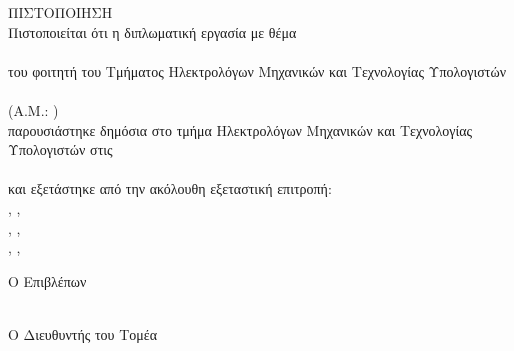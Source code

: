 \pagestyle{empty}
\begin{center}
{\LARGE ΠΙΣΤΟΠΟΙΗΣΗ\\[1cm]}
\large Πιστοποιείται ότι η διπλωματική εργασία με θέμα\\[1cm]
\textbf{\bf \large \doctitle }\\[1cm]
του φοιτητή του Τμήματος Ηλεκτρολόγων Μηχανικών και Τεχνολογίας Υπολογιστών\\[1cm]
\textbf{\metonoi}\\[0.5cm]
(Α.Μ.: \studnum)\\[1cm]
παρουσιάστηκε δημόσια στο τμήμα  Ηλεκτρολόγων Μηχανικών και Τεχνολογίας Υπολογιστών στις\\[1cm]
\Large{\imerominiaExetasis}\\[1cm]
\large και εξετάστηκε από την ακόλουθη εξεταστική επιτροπή:\\[1cm]
\supname, \suptitle, \uoP\\[0.2cm]
\epitropiEna, \epitropiEnaTitle, \uoP\\[0.2cm]
\epitropiDyo, \epitropiDyoTitle, \uoP\\[1cm]
\end{center}
\begin{minipage}{0.5\textwidth}
\begin{flushleft} \large
Ο Επιβλέπων\\[0.5cm]
\supname\\
\emph{\suptitle}
\end{flushleft}
\end{minipage}
\begin{minipage}{0.5\textwidth}
\begin{flushright} \large
Ο Διευθυντής του Τομέα\\[0.5cm]
\headofdivision\\
\emph{\headofdivisiontitle}
\end{flushright}
\end{minipage}